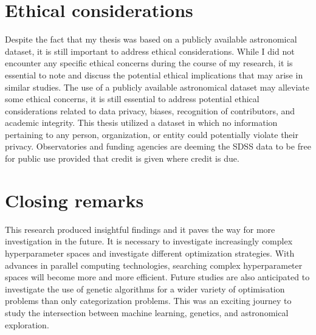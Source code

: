 \section{Ethical considerations}
Despite the fact that my thesis was based on a publicly available astronomical dataset, it is still important to address ethical considerations. While I did not encounter any specific ethical concerns during the course of my research, it is essential to note and discuss the potential ethical implications that may arise in similar studies. The use of a publicly available astronomical dataset may alleviate some ethical concerns, it is still essential to address potential ethical considerations related to data privacy, biases, recognition of contributors, and academic integrity. This thesis utilized a dataset in which no information pertaining to any person, organization, or entity could potentially violate their privacy. Observatories and funding agencies are deeming the SDSS data to be free for public use provided that credit is given where credit is due.

\section{Closing remarks}
This research produced insightful findings and it paves the way for more investigation in the future. It is necessary to investigate increasingly complex hyperparameter spaces and investigate different optimization strategies. With advances in parallel computing technologies, searching complex hyperparameter spaces will become more and more efficient. Future studies are also anticipated to investigate the use of genetic algorithms for a wider variety of optimisation problems than only categorization problems.
This was an exciting journey to study the intersection between machine learning, genetics, and astronomical exploration.